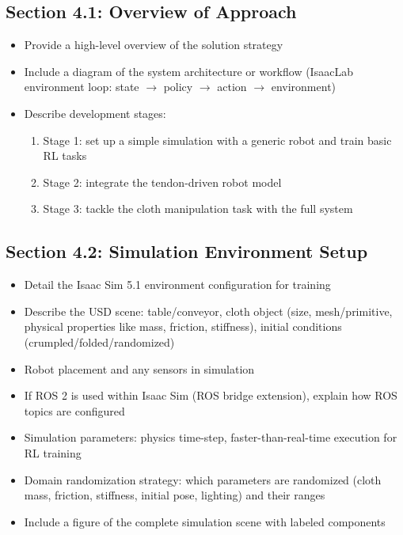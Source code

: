 \subsection{Section 4.1: Overview of Approach}
\begin{itemize}
    \item Provide a high-level overview of the solution strategy
    \item Include a diagram of the system architecture or workflow (IsaacLab environment loop: state $\rightarrow$ policy $\rightarrow$ action $\rightarrow$ environment)
    \item Describe development stages:
    \begin{enumerate}
        \item Stage 1: set up a simple simulation with a generic robot and train basic RL tasks
        \item Stage 2: integrate the tendon-driven robot model
        \item Stage 3: tackle the cloth manipulation task with the full system
    \end{enumerate}
\end{itemize}

\subsection{Section 4.2: Simulation Environment Setup}
\begin{itemize}
    \item Detail the Isaac Sim 5.1 environment configuration for training
    \item Describe the USD scene: table/conveyor, cloth object (size, mesh/primitive, physical properties like mass, friction, stiffness), initial conditions (crumpled/folded/randomized)
    \item Robot placement and any sensors in simulation
    \item If ROS 2 is used within Isaac Sim (ROS bridge extension), explain how ROS topics are configured
    \item Simulation parameters: physics time-step, faster-than-real-time execution for RL training
    \item Domain randomization strategy: which parameters are randomized (cloth mass, friction, stiffness, initial pose, lighting) and their ranges
    \item Include a figure of the complete simulation scene with labeled components
\end{itemize}

